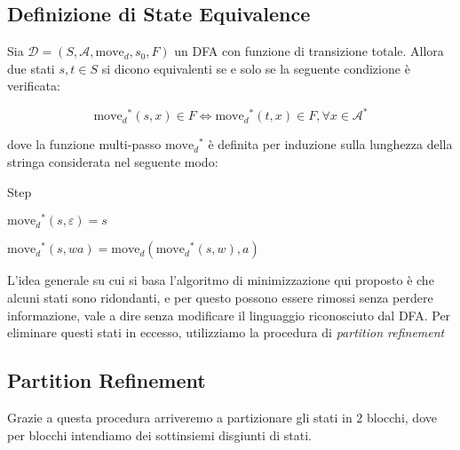 \documentclass[class=book, crop=false, oneside, 12pt]{standalone}
\begin{document}
\subsection{Definizione di State Equivalence}
\begin{definition}
    Sia \(\mathcal{D} = (S,\mathcal{A},\textrm{move}_{d},s_{0},F)\) un DFA con funzione di transizione totale. Allora due stati \(s,t \in S\) si dicono equivalenti se e solo se la seguente condizione è verificata:

    \begin{equation}
        \textrm{move}_{d}\!^{*}(s,x) \in F \iff \textrm{move}_{d}\!^{*}(t,x) \in F,  \forall x \in \mathcal{A}^{*} 
    \end{equation}
    
    \noindent dove la funzione multi-passo \(\textrm{move}_{d}\!^{*}\) è definita per induzione sulla lunghezza della stringa considerata nel seguente modo:

    \begin{labeling}{Step}
        \item[Base] \(\textrm{move}_{d}\!^{*}(s,\varepsilon)=s\) 
        \item[Step] \(\textrm{move}_{d}\!^{*}(s,wa)= \textrm{move}_{d}(\textrm{move}_{d}\!^{*}(s,w),a)\)
    \end{labeling}    
\end{definition}

L'idea generale su cui si basa l'algoritmo di minimizzazione qui proposto è che alcuni stati sono ridondanti, e per questo possono essere rimossi senza perdere informazione, vale a dire senza modificare il linguaggio riconosciuto dal DFA. Per eliminare questi stati in eccesso, utilizziamo la procedura di \emph{partition refinement}

\subsection{Partition Refinement}
Grazie a questa procedura arriveremo a partizionare gli stati in \(2\) blocchi, dove per blocchi intendiamo dei sottinsiemi disgiunti di stati.
\end{document}
